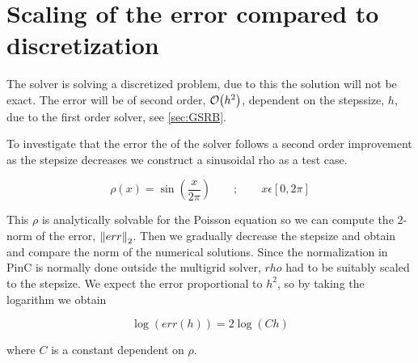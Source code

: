 \section{Scaling of the error compared to discretization}
The solver is solving a discretized problem, due to this the solution will not
be exact. The error will be of second order, \(\order{h^2}\), dependent on the
stepssize, \(h\), due to the first order solver, see \cref{sec:GSRB}.


To investigate that the error the of the solver follows a second order improvement
as the stepsize decreases we construct a sinusoidal rho as a test case.

\begin{equation}
    \rho(x) = \sin{\left(\frac{x}{2\pi}\right)}      \qquad ; \qquad x\epsilon[0,2\pi]
\end{equation}

This \(\rho\) is analytically solvable for the Poisson equation so we can compute the
\(2\)-norm of the error, \(\norm{err}_2\). Then we gradually decrease the stepsize
and obtain and compare the norm of the numerical solutions. Since the normalization in PinC
is normally done outside the multigrid solver, \(rho\) had to be suitably scaled
to the stepsize. We expect the error proportional to \(h^2\), so by taking the logarithm
we obtain

\begin{equation}
    \log(err(h)) = 2\log(Ch)
\end{equation}

where \(C\) is a constant dependent on \(\rho\).

